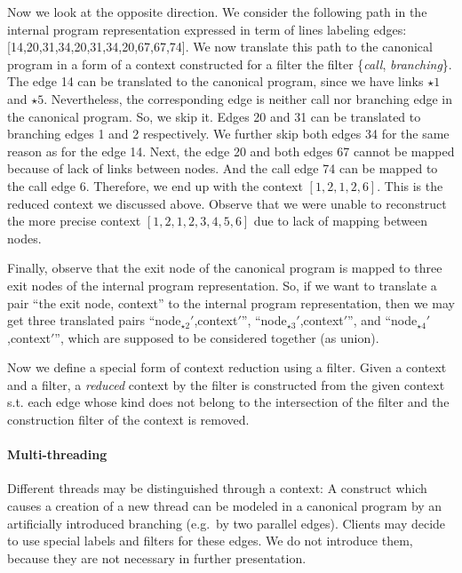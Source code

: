 \documentclass[envcountsame]{llncs}
\begin{document}
Now we look at the opposite direction. We consider the following path in the
internal program representation expressed in term of lines labeling edges:
[14,20,31,34,20,31,34,20,67,67,74]. We now translate this path to the canonical
program in a form of a context constructed for a filter the filter
\{\textit{call}, \textit{branching}\}. The edge 14 can be translated to the
canonical program, since we have links $ \star1 $ and $ \star5 $. Nevertheless,
the corresponding edge is neither call nor branching edge in the canonical
program. So, we skip it. Edges 20 and 31 can be translated to branching edges 1
and 2 respectively. We further skip both edges 34 for the same reason as for the
edge 14. Next, the edge 20 and both edges 67 cannot be mapped because of lack of
links between nodes. And the call edge 74 can be mapped to the call edge 6.
Therefore, we end up with the context $ [1,2,1,2,6] $. This is the reduced
context we discussed above. Observe that we were unable to reconstruct the more
precise context $ [1,2,1,2,3,4,5,6] $ due to lack of mapping between nodes.

Finally, observe that the exit node of the canonical program is mapped to three
exit nodes of the internal program representation. So, if we want to translate a
pair ``the exit node, context'' to the internal program representation, then we
may get three translated pairs ``node$ _{\star2}' $,context$ ' $'', ``node$
_{\star3}' $,context$ ' $'', and ``node$ _{\star4}' $,context$ ' $'', which are
supposed to be considered together (as union).

Now we define a special form of context reduction using a filter. Given a
context and a filter, a \emph{reduced} context by the filter is constructed from
the given context s.t. each edge whose kind does not belong to the intersection
of the filter and the construction filter of the context is removed.

\paragraph{Multi-threading}
\label{sec:Multi-threading}

Different threads may be distinguished through a context: A construct which
causes a creation of a new thread can be modeled in a canonical program by an
artificially introduced branching (e.g.~by two parallel edges). Clients may
decide to use special labels and filters for these edges. We do not introduce
them, because they are not necessary in further presentation.
\end{document}
